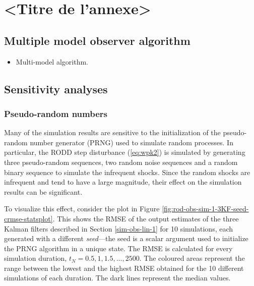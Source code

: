 \chapter{<Titre de l'annexe>}     %
\label{chap-}                   %

\section{Multiple model observer algorithm}

\begin{itemize}
	\item Multi-model algorithm.
\end{itemize}


\section{Sensitivity analyses}

\subsection{Pseudo-random numbers}

Many of the simulation results are sensitive to the initialization of the pseudo-random number generator (PRNG) used to simulate random processes. In particular, the RODD step disturbance (\ref{eq:wpk2}) is simulated by generating three pseudo-random sequences, two random noise sequences and a random binary sequence to simulate the infrequent shocks.  Since the random shocks are infrequent and tend to have a large magnitude, their effect on the simulation results can be significant.

To visualize this effect, consider the plot in Figure \ref{fig:rod-obs-sim-1-3KF-seed-crmse-statsplot}. This shows the RMSE of the output estimates of the three Kalman filters described in Section \ref{sim-obs-lin-1} for 10 simulations, each generated with a different \textit{seed}—the seed is a scalar argument used to initialize the PRNG algorithm in a unique state. The RMSE is calculated for every simulation duration, $t_N=0.5,1,1.5,...,2500$. The coloured areas represent the range between the lowest and the highest RMSE obtained for the 10 different simulations of each duration. The dark lines represent the median values.


